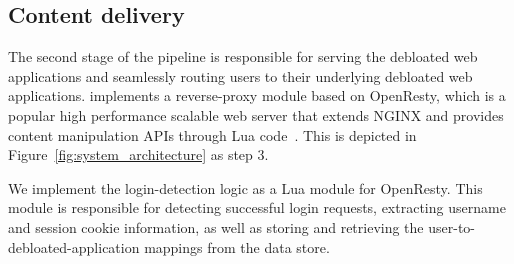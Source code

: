 \subsection{Content delivery}
\label{sec:content_delivery}

The second stage of the \dbltr{} pipeline is responsible for serving the debloated web applications and seamlessly routing users to their underlying debloated web applications. 
\dbltr{} implements a reverse-proxy module based on OpenResty, which is a popular high performance scalable web server that extends NGINX and provides content manipulation APIs through Lua code~\cite{openresty}. 
This is depicted in Figure~\ref{fig:system_architecture} as step 3. 

We implement the login-detection logic as a Lua module for OpenResty. 
This module is responsible for detecting successful login requests, extracting username and session cookie information, as well as storing and retrieving the user-to-debloated-application mappings from the data store.


